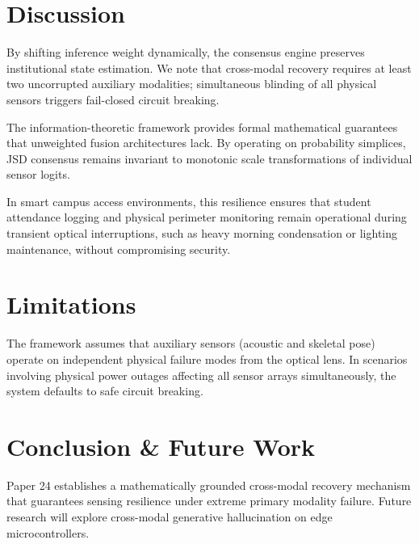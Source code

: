 \documentclass[conference]{IEEEtran}
\begin{document}
\section{Discussion}
By shifting inference weight dynamically, the consensus engine preserves institutional state estimation. We note that cross-modal recovery requires at least two uncorrupted auxiliary modalities; simultaneous blinding of all physical sensors triggers fail-closed circuit breaking.

The information-theoretic framework provides formal mathematical guarantees that unweighted fusion architectures lack. By operating on probability simplices, JSD consensus remains invariant to monotonic scale transformations of individual sensor logits.

In smart campus access environments, this resilience ensures that student attendance logging and physical perimeter monitoring remain operational during transient optical interruptions, such as heavy morning condensation or lighting maintenance, without compromising security.

\section{Limitations}
The framework assumes that auxiliary sensors (acoustic and skeletal pose) operate on independent physical failure modes from the optical lens. In scenarios involving physical power outages affecting all sensor arrays simultaneously, the system defaults to safe circuit breaking.

\section{Conclusion & Future Work}
Paper 24 establishes a mathematically grounded cross-modal recovery mechanism that guarantees sensing resilience under extreme primary modality failure. Future research will explore cross-modal generative hallucination on edge microcontrollers.
\end{document}

